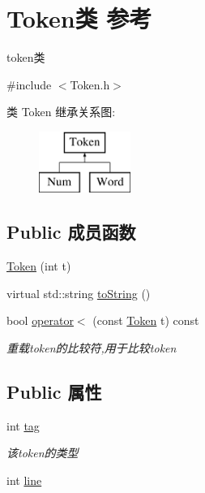 \hypertarget{class_token}{}\section{Token类 参考}
\label{class_token}


token类  




{\ttfamily \#include $<$Token.\+h$>$}

类 Token 继承关系图\+:\begin{figure}[H]
\begin{center}
\leavevmode
\includegraphics[height=2.000000cm]{class_token}
\end{center}
\end{figure}
\subsection*{Public 成员函数}
\begin{DoxyCompactItemize}
\item 
\hyperlink{class_token_a29580f176bfba9981aeec62946114675}{Token} (int t)
\item 
virtual std\+::string \hyperlink{class_token_a8863381edabce7bc1e92473b445ba81f}{to\+String} ()
\item 
bool \hyperlink{class_token_a157a63b83c2b18a64ba1f4170d476895}{operator$<$} (const \hyperlink{class_token}{Token} t) const \hypertarget{class_token_a157a63b83c2b18a64ba1f4170d476895}{}\label{class_token_a157a63b83c2b18a64ba1f4170d476895}

\begin{DoxyCompactList}\small\item\em 重载token的比较符,用于比较token \end{DoxyCompactList}\end{DoxyCompactItemize}
\subsection*{Public 属性}
\begin{DoxyCompactItemize}
\item 
int \hyperlink{class_token_a2a4b0e1b648c2a9be1976004eb3c4ff0}{tag}\hypertarget{class_token_a2a4b0e1b648c2a9be1976004eb3c4ff0}{}\label{class_token_a2a4b0e1b648c2a9be1976004eb3c4ff0}

\begin{DoxyCompactList}\small\item\em 该token的类型 \end{DoxyCompactList}\item 
int \hyperlink{class_token_a4b96c2a31d7c374fd2bd1986794f80dd}{line}
\end{DoxyCompactItemize}


